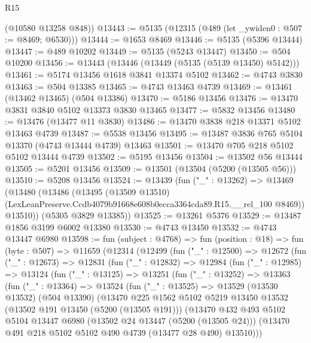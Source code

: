 \begin{lexlean}{R15}
\begin{coremodule}
{{{{{{{{{{{      (@10580 @13258 @848))
@13443 := @5135 (@12315 (@489 (let _ywiden0 : @507 := @8469; @6530)))
@13444 := @1653 @8469
@13446 := @5135 (@5396 @13444)
@13447 := @489 @10202
@13449 := @5135 (@5243 @13447)
@13450 := @504 @10200
@13456 := @13443 (@13446 (@13449 (@5135 (@5139 @13450) @5142)))
@13461 := @5174 @13456 @1618 @3841 @13374 @5102
@13462 := @4743 @3830
@13463 := @504 @13385
@13465 := @4743 @13463 @4739
@13469 := @13461 (@13462 @13465) (@504 @13386)
@13470 := @5186 @13456
@13476 := @13470 @3831 @3840 @5102 @13373 @3830 @13465
@13477 := @5832 @13456
@13480 := @13476 (@13477 @11 @3830)
@13486 := @13470 @3838 @218 @13371 @5102 @13463 @4739
@13487 := @5538 @13456
@13495 := @13487 @3836 @765 @5104 @13370 (@4743 @13444 @4739) @13463
@13501 := @13470 @705 @218 @5102 @5102 @13444 @4739
@13502 := @5195 @13456
@13504 := @13502 @56 @13444
@13505 := @5201 @13456
@13509 := @13501 (@13504 (@5200 (@13505 @56)))
@13510 := @5208 @13456
@13524 := @13439
    (fun ("_" : @13262) =>
    @13469
      (@13480
        (@13486
          (@13495
            (@13509 @13510)
            (LexLeanPreserve.Ccdb4079b91668e608b0ecca3364cda89.R15.__rel_100 @8469))
          @13510))
      (@5305 @3829 @13385))
@13525 := @13261 @5376
@13529 := @13487 @1856 @3199 @6002 @13380
@13530 := @4743 @13450
@13532 := @4743 @13447 @6980
@13598 := fun (subject : @4768) =>
  fun (position : @18) =>
  fun (byte : @507) =>
  @11659
    (@12314
      (@12499
        (fun ("_" : @12500) =>
        @12672
          (fun ("_" : @12673) =>
          @12831
            (fun ("_" : @12832) =>
            @12984
              (fun ("_" : @12985) =>
              @13124
                (fun ("_" : @13125) =>
                @13251
                  (fun ("_" : @13252) =>
                  @13363
                    (fun ("_" : @13364) =>
                    @13524
                      (fun ("_" : @13525) =>
                      @13529
                        (@13530 @13532)
                        (@504 @13390)
                        (@13470
                          @225
                          @1562
                          @5102
                          @5219
                          @13450
                          @13532
                          (@13502 @191 @13450 (@5200 (@13505 @191)))
                          (@13470
                            @432
                            @493
                            @5102
                            @5104
                            @13447
                            @6980
                            (@13502 @24 @13447 (@5200 (@13505 @24)))
                            (@13470 @491 @218 @5102 @5102 @490 @4739 (@13477 @28 @490) @13510)))
}}}}}}}}}}}
\end{coremodule}
\end{lexlean}
